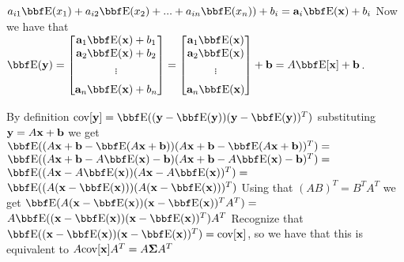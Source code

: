 \documentclass[12pt,letterpaper]{hmcpset}
\begin{document}
\begin{solution}
    $a_{i1}\EE (x_1) + a_{i2}\EE (x_2) + ... + a_{in}\EE (x_n)) + b_i = \aa_{i}\EE (\xx)+b_{i}$
    Now we have that $\EE (\yy) = 
    \begin{bmatrix}
    \aa_{1}\EE (\xx)+b_{1} \\%
    \aa_{2}\EE (\xx)+b_{2} \\%
    . \\[-10pt]
    . \\[-10pt]
    . \\[5pt]
    \aa_{n}\EE (\xx)+b_{n}
    \end{bmatrix} = \begin{bmatrix}
    \aa_{1}\EE (\xx) \\%
    \aa_{2}\EE (\xx) \\%
    . \\[-10pt]
    . \\[-10pt]
    . \\[5pt]
    \aa_{n}\EE (\xx)
    \end{bmatrix} + \bb = A\EE[\xx] + \bb$.
\end{solution}
\begin{solution}
    \hspace{6mm} By definition 
    $\cov[\yy] = \EE((\yy-\EE(\yy))(\yy-\EE(\yy))^T)$ substituting ${\bf y} = A{\bf x} + {\bf b}$ we get \newline
    $\EE((A\xx + \bb-\EE(A\xx + \bb))(A\xx + \bb-\EE(A\xx + \bb))^T) =$ \newline
    $ \EE((A\xx + \bb - A\EE(\xx) - \bb)(A\xx + \bb - A\EE(\xx) - \bb)^T) = $ \newline
    $ \EE((A\xx - A\EE(\xx))(A\xx - A\EE(\xx))^T) = $\newline
    $ \EE((A(\xx - \EE(\xx)))(A(\xx - \EE(\xx)))^T)$ Using that $(AB)^T = B^TA^T$ we get \newline
    $ \EE(A(\xx - \EE(\xx))(\xx - \EE(\xx))^TA^T) = $ \newline
    $ A\EE((\xx - \EE(\xx))(\xx - \EE(\xx))^T)A^T$ Recognize that $\EE((\xx - \EE(\xx))(\xx - \EE(\xx))^T) = \cov[\xx]$, so we have that this is equivalent to 
    $A{\hbox{cov}}[{\bf x}]A^T = A\hbox{\boldmath$\Sigma$} A^T$
\end{solution}
\newpage
\end{document}

